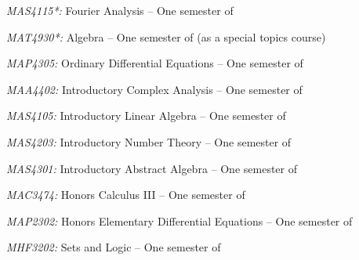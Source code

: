 \documentclass[11pt]{article}
\begin{document}
\textsl{MAS4115*:} Fourier Analysis -- One semester of

\textsl{MAT4930*\textsuperscript{\textdagger}:} Algebra -- One semester of (as a special topics course)

\textsl{MAP4305:} Ordinary Differential Equations -- One semester of

\textsl{MAA4402:} Introductory Complex Analysis -- One semester of

\textsl{MAS4105:} Introductory Linear Algebra -- One semester of

\textsl{MAS4203:} Introductory Number Theory -- One semester of

\textsl{MAS4301:} Introductory Abstract Algebra -- One semester of

\textsl{MAC3474:} Honors Calculus III -- One semester of

\textsl{MAP2302:} Honors Elementary Differential Equations -- One semester of

\textsl{MHF3202:} Sets and Logic -- One semester of
\end{document}
